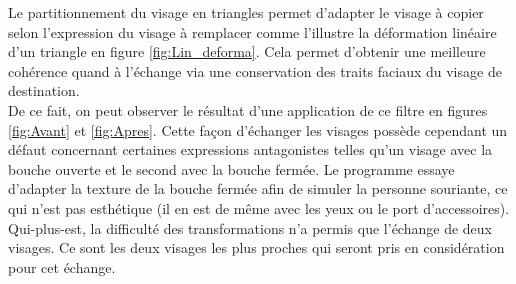 \documentclass[a4paper,french]{article}
\begin{document}
Le partitionnement du visage en triangles permet d'adapter le visage à copier selon l'expression du visage à remplacer comme l'illustre la déformation linéaire d'un triangle en figure \ref{fig:Lin_deforma}. Cela permet d'obtenir une meilleure cohérence quand à l'échange via une conservation des traits faciaux du visage de destination.\\
De ce fait, on peut observer le résultat d'une application de ce filtre en figures \ref{fig:Avant} et \ref{fig:Apres}. Cette façon d'échanger les visages possède cependant un défaut concernant certaines expressions antagonistes telles qu'un visage avec la bouche ouverte et le second avec la bouche fermée. Le programme essaye d'adapter la texture de la bouche fermée afin de simuler la personne souriante, ce qui n'est pas esthétique (il en est de même avec les yeux ou le port d'accessoires). Qui-plus-est, la difficulté des transformations n'a permis que l'échange de deux visages. Ce sont les deux visages les plus proches qui seront pris en considération pour cet échange.\\
\end{document}
